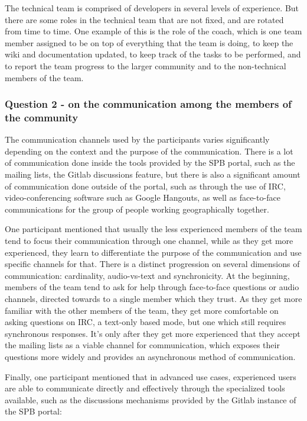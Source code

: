 \documentclass{sigchi}
\begin{document}
The technical team is comprised of developers in several levels of experience. But there are some roles in the technical team that are not fixed, and are rotated from time to time. One example of this is the role of the coach, which is one team member assigned to be on top of everything that the team is doing, to keep the wiki and documentation updated, to keep track of the tasks to be performed, and to report the team progress to the larger community and to the non-technical members of the team.


\subsubsection{Question 2 - on the communication among the members of the community}
The communication channels used by the participants varies significantly depending on the context and the purpose of the communication. There is a lot of communication done inside the tools provided by the SPB portal, such as the mailing lists, the Gitlab discussions feature, but there is also a significant amount of communication done outside of the portal, such as through the use of IRC, video-conferencing software such as Google Hangouts, as well as face-to-face communications for the group of people working geographically together.

One participant mentioned that usually the less experienced members of the team tend to focus their communication through one channel, while as they get more experienced, they learn to differentiate the purpose of the communication and use specific channels for that. There is a distinct progression on several dimensions of communication: cardinality, audio-vs-text and synchronicity. At the beginning, members of the team tend to ask for help through face-to-face questions or audio channels, directed towards to a single member which they trust. As they get more familiar with the other members of the team, they get more comfortable on asking questions on IRC, a text-only based mode, but one which still requires synchronous responses. It's only after they get more experienced that they accept the mailing lists as a viable channel for communication, which exposes their questions more widely and provides an asynchronous method of communication.

Finally, one participant mentioned that in advanced use cases, experienced users are able to communicate directly and effectively through the specialized tools available, such as the discussions mechanisms provided by the Gitlab instance of the SPB portal:
\end{document}
